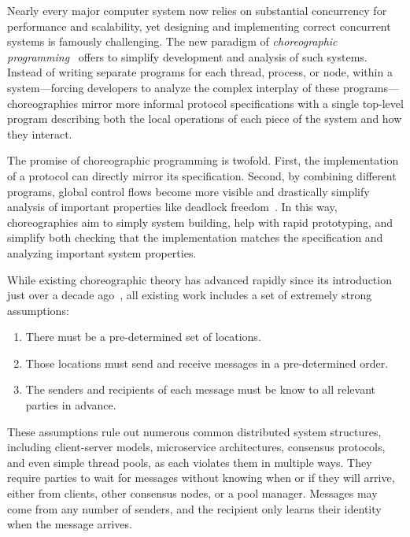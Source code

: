 Nearly every major computer system now relies on substantial concurrency for performance and scalability,
yet designing and implementing correct concurrent systems is famously challenging.
The new paradigm of \emph{choreographic programming}~\citep{Montesi13,Montesi23} offers to simplify development and analysis of such systems.
Instead of writing separate programs for each thread, process, or node, within a system---forcing developers to analyze the complex interplay of these programs---%
choreographies mirror more informal protocol specifications with a single top-level program
describing both the local operations of each piece of the system and how they interact.

The promise of choreographic programming is twofold.
First, the implementation of a protocol can directly mirror its specification.
Second, by combining different programs, global control flows become more visible
and drastically simplify analysis of important properties like deadlock freedom~\citep{CarboneM13}.
In this way, choreographies aim to simply system building, help with rapid prototyping,
and simplify both checking that the implementation matches the specification
and analyzing important system properties.

While existing choreographic theory has advanced rapidly since its introduction just over a decade ago~\citep{CarboneM13,HirschG22,CruzFilipeGLMP22,CruzFilipeGLMP23,BatesK+25,SamuelsonHC25},
all existing work includes a set of extremely strong assumptions:
\begin{enumerate}
  \item There must be a pre-determined set of locations.
  \item Those locations must send and receive messages in a pre-determined order.
  \item The senders and recipients of each message must be know to all relevant parties in advance.
\end{enumerate}

These assumptions rule out numerous common distributed system structures,
including client-server models, microservice architectures, consensus protocols, and even simple thread pools,
as each violates them in multiple ways.
They require parties to wait for messages without knowing when or if they will arrive,
either from clients, other consensus nodes, or a pool manager.
Messages may come from any number of senders, and the recipient only learns their identity when the message arrives.

